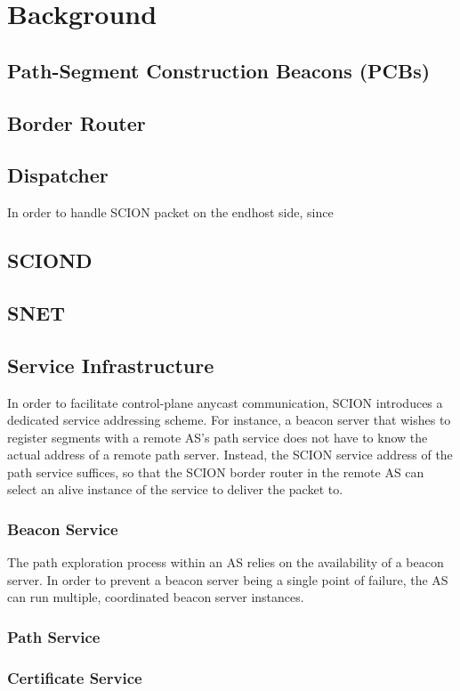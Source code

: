 
\chapter{Background} %

\label{background} %

\section{Path-Segment Construction Beacons (PCBs)}

\section{Border Router}

\section{Dispatcher}
In order to handle SCION packet on the endhost side, since
\section{SCIOND}

\section{SNET}

\section{Service Infrastructure}
In order to facilitate control-plane anycast communication, SCION introduces a dedicated service addressing scheme. For instance, a beacon server that wishes to register segments with a remote AS's path service does not have to know the actual address of a remote path server. Instead, the SCION service address of the path service suffices, so that the SCION border router in the remote AS can select an alive instance of the service to deliver the packet to.
\subsection{Beacon Service}
The path exploration process within an AS relies on the availability of a beacon server. In order to prevent a beacon server being a single point of failure, the AS can run multiple, coordinated beacon server instances.
\subsection{Path Service}
\subsection{Certificate Service}